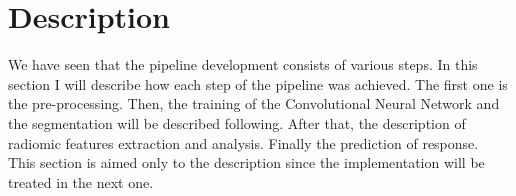 \documentclass{standalone}
\begin{document}
\section{Description}
We have seen that the pipeline development consists of various steps.
In this section I will describe how each step of the pipeline was achieved.
The first one is the pre-processing.
Then, the training of the Convolutional Neural Network and the segmentation will be described following.
After that, the description of radiomic features extraction and analysis.
Finally the prediction of response.\\
This section is aimed only to the description since the implementation will be treated in the next one.
\end{document}
